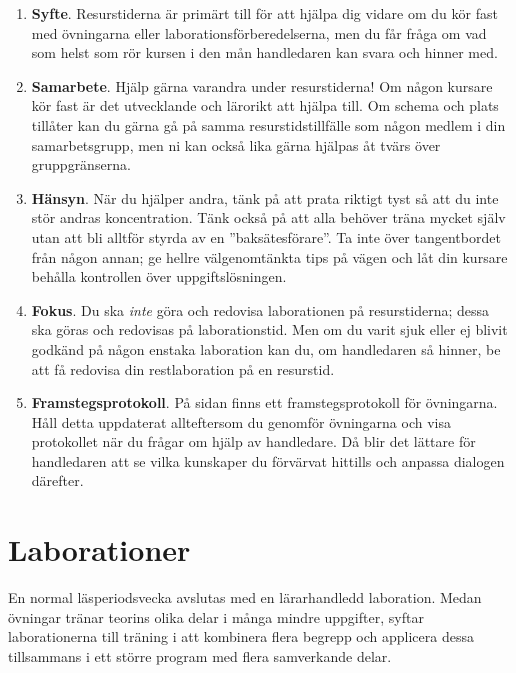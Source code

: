 \begin{enumerate}
\item \textbf{Syfte}. Resurstiderna är primärt till för att hjälpa dig vidare om du kör fast med övningarna eller laborationsförberedelserna, men du får fråga om vad som helst som rör kursen i den mån handledaren kan svara och hinner med.

\item \textbf{Samarbete}. Hjälp gärna varandra under resurstiderna! Om någon kursare kör fast är det utvecklande och lärorikt att hjälpa till. Om schema och plats tillåter kan du gärna gå på samma resurstidstillfälle som någon medlem i din samarbetsgrupp, men ni kan också lika gärna hjälpas åt tvärs över gruppgränserna.

\item \textbf{Hänsyn}. När du hjälper andra, tänk på att prata riktigt tyst så att du inte stör andras koncentration. Tänk också på att alla behöver träna mycket själv utan att bli alltför styrda av en ''baksätesförare''. Ta inte över tangentbordet från någon annan; ge hellre välgenomtänkta tips på vägen och låt din kursare behålla kontrollen över uppgiftslösningen.


\item \textbf{Fokus}. Du ska \emph{inte} göra och redovisa laborationen på resurstiderna; dessa ska göras och redovisas på laborationstid. Men om du varit sjuk eller ej blivit godkänd på någon enstaka laboration kan du, om handledaren så hinner, be att få redovisa din restlaboration på en resurstid.

\item \textbf{Framstegsprotokoll}. På sidan \pageref{progress-protocoll} finns ett framstegsprotokoll för övningarna. Håll detta uppdaterat allteftersom du genomför övningarna och visa protokollet när du frågar om hjälp av handledare. Då blir det lättare för handledaren att se vilka kunskaper du förvärvat hittills och anpassa dialogen därefter.


\end{enumerate}
\section{Laborationer}\label{section:labs}

En normal läsperiodsvecka avslutas med en lärarhandledd laboration. Medan övningar tränar teorins olika delar i många mindre uppgifter, syftar laborationerna till träning i att kombinera flera begrepp och applicera dessa tillsammans i ett större program med flera samverkande delar.


